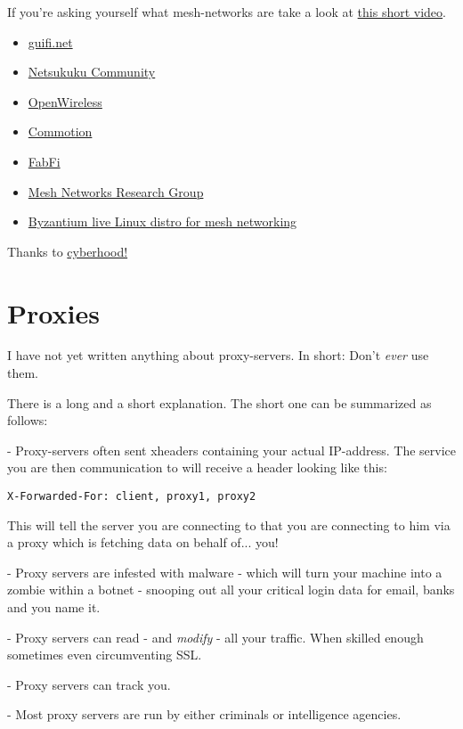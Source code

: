 \documentclass{article}
\begin{document}
 If you're asking yourself what mesh-networks are take a look at \href{http://youtu.be/tYLU755T6_I}{this short video}. 
\begin{itemize}
	\item \href{https://guifi.net/en}{guifi.net}
	\item \href{http://netsukuku.freaknet.org/}{Netsukuku Community}
	\item \href{https://openwireless.org/}{OpenWireless}
	\item \href{https://commotionwireless.net/}{Commotion}
	\item \href{https://code.google.com/p/fabfi/wiki/FabFi}{FabFi}
	\item \href{http://www.mesh-networks.org/}{Mesh Networks Research Group}
	\item \href{http://project-byzantium.org/}{Byzantium live Linux distro for mesh networking}
\end{itemize} Thanks to \href{http://crunchbang.org/forums/viewtopic.php?pid=245116#p245116}{cyberhood!}
\section{Proxies}


 I have not yet written anything about proxy-servers. In short: Don't \emph{ever} use them. 


 There is a long and a short explanation. The short one can be summarized as follows:


 - Proxy-servers often sent xheaders containing your actual IP-address. The service you are then communication to will receive a header looking like this: 
\begin{lstlisting}
X-Forwarded-For: client, proxy1, proxy2
\end{lstlisting}



 This will tell the server you are connecting to that you are connecting to him via a proxy which is fetching data on behalf of... you!


 - Proxy servers are infested with malware - which will turn your machine into a zombie within a botnet - snooping out all your critical login data for email, banks and you name it. 


 - Proxy servers can read - and \emph{modify} - all your traffic. When skilled enough sometimes even circumventing SSL.


 - Proxy servers can track you.


 - Most proxy servers are run by either criminals or intelligence agencies.
\end{document}

